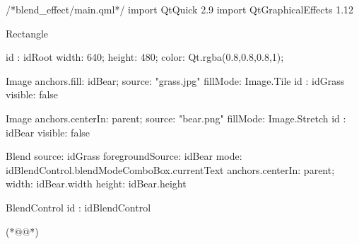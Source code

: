 \label{f000052}    %
\FloatBarrier                                  %
\begin{thebookfilesourceone}[escapeinside={(*@}{@*)},
caption=GoodLuck,
title=\filesourcenumbernameone \thefilesourcenumber
]
/*blend_effect/main.qml*/
import QtQuick 2.9
import QtGraphicalEffects 1.12

Rectangle {
    id : idRoot
    width: 640;
    height: 480;
    color: Qt.rgba(0.8,0.8,0.8,1);

    Image{
        anchors.fill: idBear;
        source: "grass.jpg"
        fillMode: Image.Tile
        id : idGrass
        visible: false
    }

    Image{
        anchors.centerIn: parent;
        source: "bear.png"
        fillMode: Image.Stretch
        id : idBear
        visible: false
    }

    Blend{
        source: idGrass
        foregroundSource: idBear
        mode: idBlendControl.blendModeComboBox.currentText
        anchors.centerIn: parent;
        width: idBear.width
        height: idBear.height
    }

    BlendControl {
        id : idBlendControl
    }

}(*@\marginpar[\hfill\setlength\fboxsep{2pt}\fbox{\footnotesize{\kaishu\parbox{1em}{\setlength{\baselineskip}{2pt}\filesourcenumbernameone}}\footnotesize{\thefilesourcenumber}}]{\setlength\fboxsep{2pt}\fbox{\footnotesize{\kaishu\parbox{1em}{\setlength{\baselineskip}{2pt}\filesourcenumbernameone}}\footnotesize{\thefilesourcenumber}}}@*)\end{thebookfilesourceone}          %
\addtocounter{lstlisting}{-1}   %









